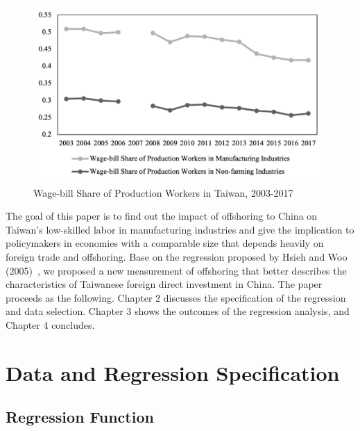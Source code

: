 \documentclass{article}
\begin{document}
\begin{figure}
\centering
\includegraphics[width=1\textwidth]{figure2.png}
\caption{\label{fig:2}Wage-bill Share of Production Workers in Taiwan, 2003-2017}
\source{}
\end{figure}
The goal of this paper is to find out the impact of offshoring to China on Taiwan’s low-skilled labor in manufacturing industries and give the implication to policymakers in economies with a comparable size that depends heavily on foreign trade and offshoring. Base on the regression proposed by Hsieh and Woo (2005)~\cite{hsieh}, we proposed a new measurement of offshoring that better describes the characteristics of Taiwanese foreign direct investment in China. 
The paper proceeds as the following. Chapter 2 discusses the specification of the regression and data selection. Chapter 3 shows the outcomes of the regression analysis, and Chapter 4 concludes.


\section{Data and Regression Specification}

\subsection{Regression Function}
\end{document}
